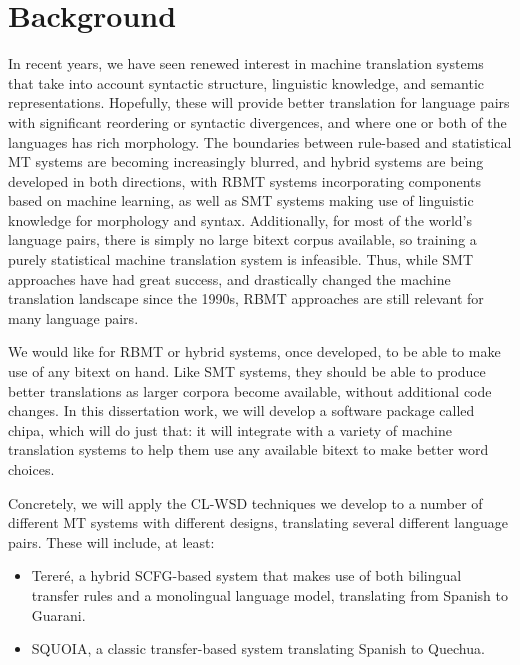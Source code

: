 \chapter{Background}

In recent years, we have seen renewed interest in machine translation systems
that take into account syntactic structure, linguistic knowledge, and semantic
representations.
Hopefully, these will provide better translation for language pairs with
significant reordering or syntactic divergences, and where one or both of the
languages has rich morphology.
The boundaries between rule-based and statistical MT systems are becoming
increasingly blurred, and hybrid systems are being developed in both
directions, with RBMT systems incorporating components based on machine
learning, as well as SMT systems making use of linguistic knowledge for
morphology and syntax.
Additionally, for most of the world's language pairs, there is simply no large
bitext corpus available, so training a purely statistical machine translation
system is infeasible.
Thus, while SMT approaches have had great success, and drastically changed the
machine translation landscape since the 1990s, RBMT approaches are still
relevant for many language pairs.

We would like for RBMT or hybrid systems, once developed, to be able to make
use of any bitext on hand.  Like SMT systems, they should be able to produce
better translations as larger corpora become available, without additional code
changes.
In this dissertation work, we will develop a software package called
chipa, which will do just that: %
it will integrate with a variety of machine translation systems to help them
use any available bitext to make better word choices.

Concretely, we will apply the CL-WSD techniques we develop to a number of
different MT systems with different designs, translating several different
language pairs.  These will include, at least:
\begin{itemize}
\item Tereré, a hybrid SCFG-based system that makes use of both bilingual
transfer rules and a monolingual language model, translating from Spanish to
Guarani.
\item SQUOIA, a classic transfer-based system translating Spanish to Quechua.
\end{itemize}

